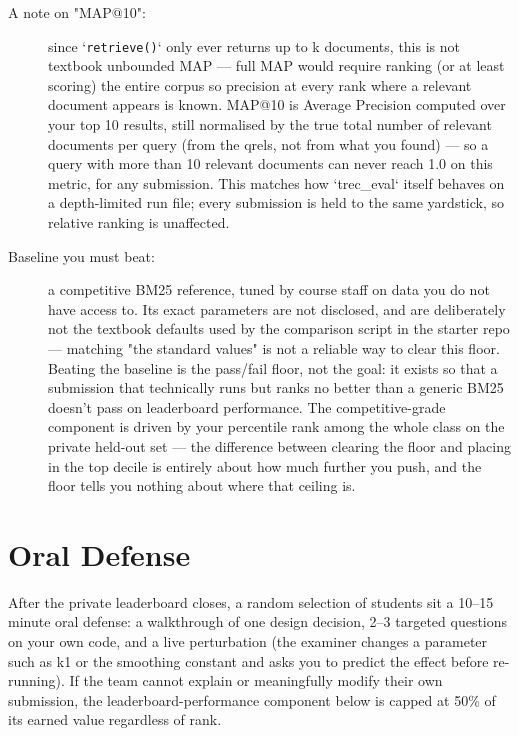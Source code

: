 \documentclass[10pt]{article}
\begin{document}
\begin{description}
\item[A note on "MAP@10":] since `\texttt{retrieve()}` only ever returns up to k documents, this is not textbook unbounded MAP — full MAP would require ranking (or at least scoring) the entire corpus so precision at every rank where a relevant document appears is known. MAP@10 is Average Precision computed over your top 10 results, still normalised by the true total number of relevant documents per query (from the qrels, not from what you found) — so a query with more than 10 relevant documents can never reach 1.0 on this metric, for any submission. This matches how `trec\_eval` itself behaves on a depth-limited run file; every submission is held to the same yardstick, so relative ranking is unaffected.
\item[Baseline you must beat:] a competitive BM25 reference, tuned by course staff on data you do not have access to. Its exact parameters are not disclosed, and are deliberately not the textbook defaults used by the comparison script in the starter repo — matching "the standard values" is not a reliable way to clear this floor. Beating the baseline is the pass/fail floor, not the goal: it exists so that a submission that technically runs but ranks no better than a generic BM25 doesn't pass on leaderboard performance. The competitive-grade component is driven by your percentile rank among the whole class on the private held-out set — the difference between clearing the floor and placing in the top decile is entirely about how much further you push, and the floor tells you nothing about where that ceiling is.
\end{description}


\section{Oral Defense}
After the private leaderboard closes, a random selection of students sit a 10–15 minute oral defense: a walkthrough of one design decision, 2–3 targeted questions on your own code, and a live perturbation (the examiner changes a parameter such as k1 or the smoothing constant and asks you to predict the effect before re-running). If the team cannot explain or meaningfully modify their own submission, the leaderboard-performance component below is capped at 50\% of its earned value regardless of rank.
\end{document}
